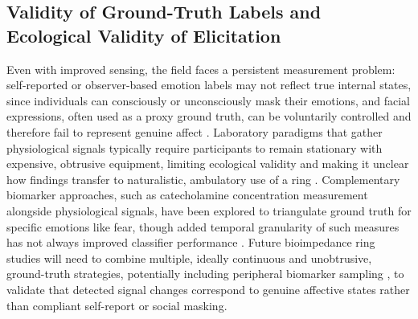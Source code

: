 \subsection{Validity of Ground-Truth Labels and Ecological Validity of Elicitation}
Even with improved sensing, the field faces a persistent measurement problem: self-reported or observer-based emotion labels may not reflect true internal states, since individuals can consciously or unconsciously mask their emotions, and facial expressions, often used as a proxy ground truth, can be voluntarily controlled and therefore fail to represent genuine affect \cite{houssein2022human,saffaryazdi2022facial}. Laboratory paradigms that gather physiological signals typically require participants to remain stationary with expensive, obtrusive equipment, limiting ecological validity and making it unclear how findings transfer to naturalistic, ambulatory use of a ring \cite{gohumpu2023emotion}. Complementary biomarker approaches, such as catecholamine concentration measurement alongside physiological signals, have been explored to triangulate ground truth for specific emotions like fear, though added temporal granularity of such measures has not always improved classifier performance \cite{qu2024advancing,gutierrezmartin2022fear}. Future bioimpedance ring studies will need to combine multiple, ideally continuous and unobtrusive, ground-truth strategies, potentially including peripheral biomarker sampling \cite{zamkah2020identification}, to validate that detected signal changes correspond to genuine affective states rather than compliant self-report or social masking.

